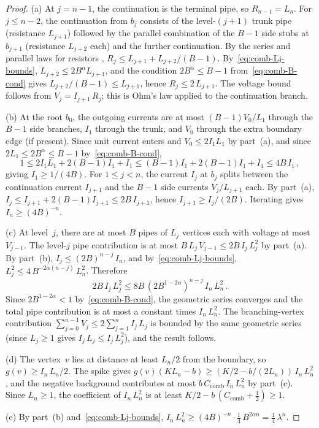 \documentclass[aop]{imsart}
\theoremstyle{plain}
\theoremstyle{definition}
\begin{document}
	\begin{proof}
		(a)\; At $j=n{-}1$, the continuation is the terminal pipe, so $R_{n-1}=L_n$.  For $j\leq n{-}2$, the continuation from $b_j$ consists of the level-$(j{+}1)$ trunk pipe (resistance $L_{j+1}$) followed by the parallel combination of the $B{-}1$ side stubs at $b_{j+1}$ (resistance $L_{j+2}$ each) and the further continuation.  By the series and parallel laws for resistors \citep[Section~2.3]{LP16}, $R_j\leq L_{j+1}+L_{j+2}/(B{-}1)$.  By~\eqref{eq:comb-Lj-bounds}, $L_{j+2}\leq 2B^{\alpha}L_{j+1}$, and the condition $2B^{\alpha}\leq B{-}1$ from~\eqref{eq:comb-B-cond} gives $L_{j+2}/(B{-}1)\leq L_{j+1}$, hence $R_j\leq 2\,L_{j+1}$.  The voltage bound follows from $V_j=I_{j+1}\,R_j$; this is Ohm's law applied to the continuation branch.
		
		\medskip
		(b)\; At the root $b_0$, the outgoing currents are at most $(B{-}1)V_0/L_1$ through the $B{-}1$ side branches, $I_1$ through the trunk, and $V_0$ through the extra boundary edge (if present).  Since unit current enters and $V_0\leq 2I_1 L_1$ by part~(a), and since $2L_1\leq 2B^{\alpha}\leq B{-}1$ by~\eqref{eq:comb-B-cond},
		\[
		1\leq 2I_1 L_1 + 2(B{-}1)I_1 + I_1 \leq (B{-}1)I_1 + 2(B{-}1)I_1 + I_1 \leq 4B\,I_1\,,
		\]
		giving $I_1\geq 1/(4B)$.  For $1\leq j<n$, the current $I_j$ at $b_j$ splits between the continuation current $I_{j+1}$ and the $B{-}1$ side currents $V_j/L_{j+1}$ each.  By part~(a), $I_j\leq I_{j+1}+2(B{-}1)I_{j+1}\leq 2B\,I_{j+1}$, hence $I_{j+1}\geq I_j/(2B)$.  Iterating gives $I_n\geq(4B)^{-n}$.
		
		\medskip
		(c)\; At level~$j$, there are at most $B$ pipes of $L_j$ vertices each with voltage at most $V_{j-1}$.  The level-$j$ pipe contribution is at most $B\,L_j\,V_{j-1}\leq 2B\,I_j\,L_j^2$ by part~(a).  By part~(b), $I_j\leq(2B)^{n-j}\,I_n$, and by~\eqref{eq:comb-Lj-bounds}, $L_j^2\leq 4\,B^{-2\alpha(n-j)}\,L_n^2$.  Therefore
		\[
		2B\,I_j\,L_j^2\leq 8B\,(2B^{1-2\alpha})^{n-j}\,I_n\,L_n^2\,.
		\]
		Since $2B^{1-2\alpha}<1$ by~\eqref{eq:comb-B-cond}, the geometric series converges and the total pipe contribution is at most a constant times $I_n\,L_n^2$.  The branching-vertex contribution $\sum_{j=0}^{n-1}V_j\leq 2\sum_{j=1}^{n}I_j\,L_j$ is bounded by the same geometric series (since $L_j\geq 1$ gives $I_j\,L_j\leq I_j\,L_j^2$), and the result follows.
		
		\medskip
		(d)\; The vertex~$v$ lies at distance at least $L_n/2$ from the boundary, so $g(v)\geq I_n\,L_n/2$.  The spike gives $g(v)(KL_n - b)\geq (K/2 - b/(2L_n))\,I_n\,L_n^2$, and the negative background contributes at most $b\,C_{\mathrm{comb}}\,I_n\,L_n^2$ by part~(c).  Since $L_n\geq 1$, the coefficient of $I_n\,L_n^2$ is at least $K/2 - b\,(C_{\mathrm{comb}}+\tfrac{1}{2})\geq 1$.
		
		\medskip
		(e)\; By part~(b) and~\eqref{eq:comb-Lj-bounds}, $I_n\,L_n^2\geq(4B)^{-n}\cdot\tfrac{1}{4}\,B^{2\alpha n}=\tfrac{1}{4}\,\lambda^n$.
	\end{proof}
	
\end{document}
